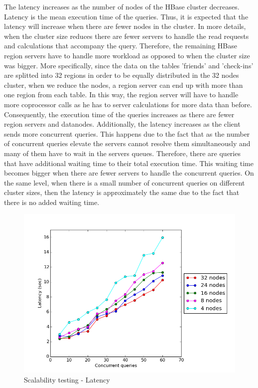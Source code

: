 The latency increases as the number of nodes of the HBase cluster decreases. Latency is the mean execution time of the queries. Thus, 
it is expected that the latency will increase when there are fewer nodes in the cluster. In more details, when the cluster size reduces there are fewer servers to 
handle the read requests and calculations that accompany the query. Therefore, the remaining HBase region servers have to handle more workload as opposed to when 
the cluster size was bigger. More specifically, since the data on the tables 'friends' and 'check-ins' are splitted into 32 regions in order to be equally 
distributed in the 32 nodes cluster, when we reduce the nodes, a region server can end up with more than one region from each table. In this way, the region 
server will have to handle more coprocessor calls as he has to server calculations for more data than before. Consequently, the execution time of the queries 
increases as there are fewer region servers and datanodes. Additionally, the latency increases as the client sends more concurrent queries. This happens due to the fact 
that as the number of concurrent queries elevate the servers cannot resolve them simultaneously and many of them have to wait in the servers queues. Therefore, 
there are queries that have additional waiting time to their total execution time. This waiting time becomes bigger when there are fewer servers to handle the 
concurrent queries. On the same level, when there is a small number of concurrent queries on different cluster sizes, then the latency is approximately the same 
due to the fact that there is no added waiting time. 

\begin{figure}[H]
  \centering
  \includegraphics[height=0.6\textwidth]{figures/scalability_latency.png}
  \caption{Scalability testing - Latency}
\end{figure}

